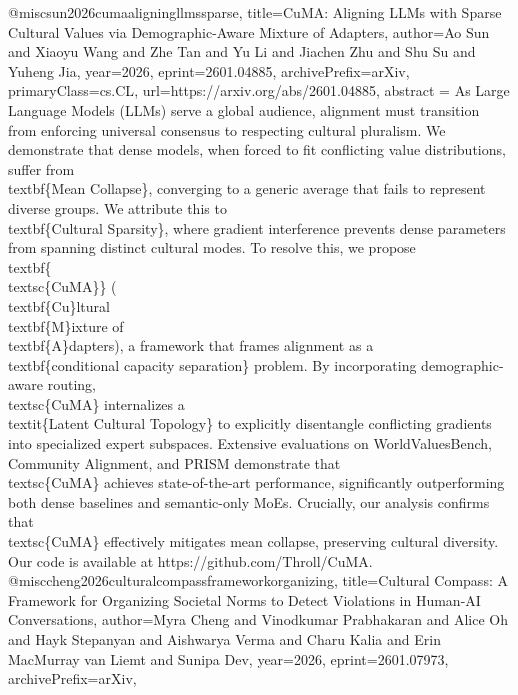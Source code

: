{}@misc{sun2026cumaaligningllmssparse,
      title={CuMA: Aligning LLMs with Sparse Cultural Values via Demographic-Aware Mixture of Adapters}, 
      author={Ao Sun and Xiaoyu Wang and Zhe Tan and Yu Li and Jiachen Zhu and Shu Su and Yuheng Jia},
      year={2026},
      eprint={2601.04885},
      archivePrefix={arXiv},
      primaryClass={cs.CL},
      url={https://arxiv.org/abs/2601.04885},
      abstract = {As Large Language Models (LLMs) serve a global audience, alignment must transition from enforcing universal consensus to respecting cultural pluralism. We demonstrate that dense models, when forced to fit conflicting value distributions, suffer from \\textbf\{Mean Collapse\}, converging to a generic average that fails to represent diverse groups. We attribute this to \\textbf\{Cultural Sparsity\}, where gradient interference prevents dense parameters from spanning distinct cultural modes. To resolve this, we propose \\textbf\{\\textsc\{CuMA\}\} (\\textbf\{Cu\}ltural \\textbf\{M\}ixture of \\textbf\{A\}dapters), a framework that frames alignment as a \\textbf\{conditional capacity separation\} problem. By incorporating demographic-aware routing, \\textsc\{CuMA\} internalizes a \\textit\{Latent Cultural Topology\} to explicitly disentangle conflicting gradients into specialized expert subspaces. Extensive evaluations on WorldValuesBench, Community Alignment, and PRISM demonstrate that \\textsc\{CuMA\} achieves state-of-the-art performance, significantly outperforming both dense baselines and semantic-only MoEs. Crucially, our analysis confirms that \\textsc\{CuMA\} effectively mitigates mean collapse, preserving cultural diversity. Our code is available at https://github.com/Throll/CuMA.}
}@misc{cheng2026culturalcompassframeworkorganizing,
      title={Cultural Compass: A Framework for Organizing Societal Norms to Detect Violations in Human-AI Conversations}, 
      author={Myra Cheng and Vinodkumar Prabhakaran and Alice Oh and Hayk Stepanyan and Aishwarya Verma and Charu Kalia and Erin MacMurray van Liemt and Sunipa Dev},
      year={2026},
      eprint={2601.07973},
      archivePrefix={arXiv},
}
